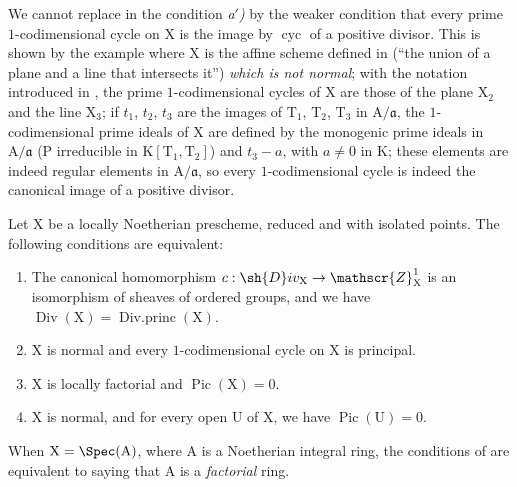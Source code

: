 \begin{remark}[21.7.5]
\label{IV.21.7.5}
We cannot replace in  the condition \emph{a$'$)} by the weaker condition that every prime $1$-codimensional cycle on $\mathrm{X}$ is the image by $\operatorname{cyc}$ of a positive divisor.
This is shown by the example where $\mathrm{X}$ is the affine scheme defined in  (``the union of a plane and a line that intersects it'') \emph{which is not normal};
with the notation introduced in , the prime $1$-codimensional cycles of $\mathrm{X}$ are those of the plane $\mathrm{X}_2$ and the line $\mathrm{X}_3$;
if $t_1$, $t_2$, $t_3$ are the images of $\mathrm{T}_1$, $\mathrm{T}_2$, $\mathrm{T}_3$ in $\mathrm{A}/\mathfrak{a}$, the $1$-codimensional prime ideals of $\mathrm{X}$ are defined by the monogenic prime ideals in $\mathrm{A}/\mathfrak{a}$ (P irreducible in $\mathrm{K}[\mathrm{T}_1,\mathrm{T}_2]$) and $t_3-a$, with $a\neq 0$ in $\mathrm{K}$;
these elements are indeed regular elements in $\mathrm{A}/\mathfrak{a}$, so every $1$-codimensional cycle is indeed the canonical image of a positive divisor.
\end{remark}

\begin{corollary}[21.7.6]
\label{IV.21.7.6}
Let $\mathrm{X}$ be a locally Noetherian prescheme, reduced and with isolated points.
The following conditions are equivalent:
\begin{enumerate}[label=\emph{\alph*)}]
  \item The canonical homomorphism $c:\sh{D}iv_\mathrm{X}\to\mathscr{Z}_\mathrm{X}^1$ is an isomorphism of sheaves of ordered groups, and we have $\operatorname{Div}(\mathrm{X})=\operatorname{Div.princ}(\mathrm{X})$.
  \item $\mathrm{X}$ is normal and every $1$-codimensional cycle on $\mathrm{X}$ is principal.
  \item $\mathrm{X}$ is locally factorial and $\operatorname{Pic}(\mathrm{X})=0$.
  \item $\mathrm{X}$ is normal, and for every open $\mathrm{U}$ of $\mathrm{X}$, we have $\operatorname{Pic}(\mathrm{U})=0$.
\end{enumerate}
\end{corollary}


\begin{remark}[21.7.7]
\label{IV.21.7.7}
When $\mathrm{X}=\Spec(\mathrm{A})$, where $\mathrm{A}$ is a Noetherian integral ring, the conditions of  are equivalent to saying that $\mathrm{A}$ is a \emph{factorial} ring.
\end{remark}


